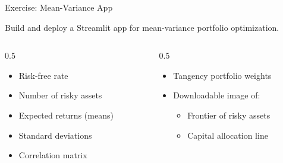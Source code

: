 \documentclass[aspectratio=169]{beamer}
\begin{document}
\begin{frame}{Exercise: Mean-Variance App}
\begin{shadedbox}
Build and deploy a Streamlit app for mean-variance portfolio optimization.
\end{shadedbox}
\vspace{0.3cm}
\begin{columns}[T]
\begin{column}{0.5\textwidth}
\begin{shadedbox}[title=\textbf{User Inputs}]
\begin{itemize}\small
  \item Risk-free rate
  \item Number of risky assets
  \item Expected returns (means)
  \item Standard deviations
  \item Correlation matrix
\end{itemize}
\end{shadedbox}
\end{column}
\begin{column}{0.5\textwidth}
\begin{shadedbox}[title=\textbf{App Outputs}]
\begin{itemize}\small
  \item Tangency portfolio weights
  \item Downloadable image of:
  \begin{itemize}\footnotesize
    \item Frontier of risky assets
    \item Capital allocation line
  \end{itemize}
\end{itemize}
\end{shadedbox}
\end{column}
\end{columns}
\end{frame}
\end{document}
